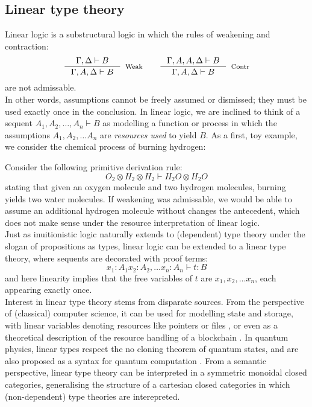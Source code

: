 \subsection{Linear type theory}
Linear logic is a substructural logic in which the rules of weakening and contraction:
\[
  \begin{split}
    \inference{\Gamma, \Delta \vdash B}{\Gamma, A, \Delta \vdash B}[Weak] \quad \quad 
    \inference{\Gamma, A, A, \Delta \vdash B}{\Gamma, A, \Delta \vdash B}[Contr]
    \end{split}
\]
are not admissable.\\
In other words, assumptions cannot be freely assumed or dismissed; they must be used exactly once in the conclusion. In linear logic, we are inclined to think of a sequent $A_1, A_2, \dots, A_n \vdash B$ as modelling a function or process in which the assumptions $A_1, A_2, \dots A_n$ are \textit{resources used} to yield $B$. As a first, toy example, we consider the chemical process of burning hydrogen:
\begin{ex}\label{burn}
Consider the following primitive derivation rule: 
\[
  O_2 \otimes H_2 \otimes H_2 \vdash H_2O \otimes H_2O
\]
stating that given an oxygen molecule and two hydrogen molecules, burning yields two water molecules. If weakening was admissable, we would be able to assume an additional hydrogen molecule without changes the antecedent, which does not make sense under the resource interpretation of linear logic.\\
Just as inuitionistic logic naturally extends to (dependent) type theory under the slogan of propositions as types, linear logic can be extended to a linear type theory, where sequents are decorated with proof terms:
\[
  x_1 : A_1 x_2 : A_2, \dots x_n : A_n \vdash t : B
\]
and here linearity implies that the free variables of $t$ are $x_1, x_2, \dots x_n$, each appearing exactly once.\\
Interest in linear type theory stems from disparate sources. From the perspective of (classical) computer science, it can be used for modelling state and storage, with linear variables denoting resources like pointers or files \cite{krishnaswami}, or even as a theoretical description of the resource handling of a blockchain \cite{meredith2015linear}. In quantum physics, linear types respect the no cloning theorem of quantum states, and are also proposed as a syntax for quantum computation \cite{duncan2006types}. From a semantic perspective, linear type theory can be interpreted in a symmetric monoidal closed categories, generalising the structure of a cartesian closed categories in which (non-dependent) type theories are interepreted.\\
\end{ex}

%
